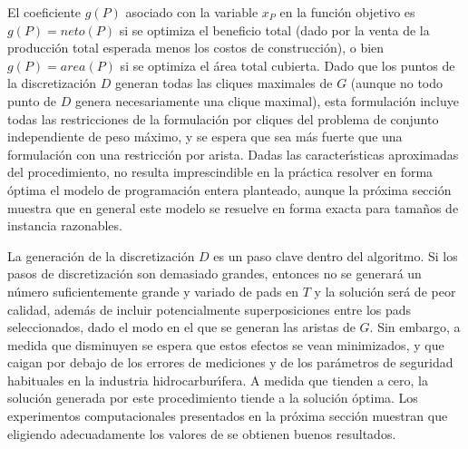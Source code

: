 El coeficiente $g(P)$ asociado con la variable $x_P$ en la funci\'on objetivo es $g(P) = neto(P)$ si se optimiza el beneficio total (dado por la venta de la producci\'on total esperada menos los costos de construcci\'on), o bien $g(P) = area(P)$ si se optimiza el \'area total cubierta. 
Dado que los puntos de la discretizaci\'on $D$ generan todas las cliques maximales de $G$ (aunque no todo punto de $D$ genera necesariamente una clique maximal), esta formulaci\'on incluye todas las restricciones de la formulaci\'on por cliques del problema de conjunto independiente de peso m\'aximo, y se espera que sea m\'as fuerte que una formulaci\'on con una restricci\'on por arista. Dadas las caracter\'\i sticas aproximadas del procedimiento, no resulta imprescindible en la pr\'actica resolver en forma \'optima el modelo de programaci\'on entera planteado, aunque la pr\'oxima secci\'on muestra que en general este modelo se resuelve en forma exacta para tama\~nos de instancia razonables.

La generaci\'on de la discretizaci\'on $D$ es un paso clave dentro del algoritmo. Si los pasos de discretizaci\'on  son demasiado grandes, entonces no se generar\'a un n\'umero suficientemente grande y variado de pads en $T$ y la soluci\'on ser\'a de peor calidad, adem\'as de incluir potencialmente superposiciones entre los pads seleccionados, dado el modo en el que se generan las aristas de $G$. Sin embargo, a medida que  disminuyen se espera que estos efectos se vean minimizados, y que caigan por debajo de los errores de mediciones y de los par\'ametros de seguridad habituales en la industria hidrocarbur\'\i fera. A medida que  tienden a cero, la soluci\'on generada por este procedimiento tiende a la soluci\'on \'optima. Los experimentos computacionales presentados en la pr\'oxima secci\'on muestran que eligiendo adecuadamente los valores de  se obtienen buenos resultados.
